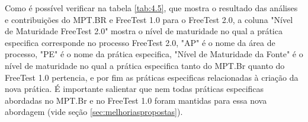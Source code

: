 Como é possível verificar na tabela \ref{tab:4.5}, que mostra o resultado das análises e contribuições do MPT.BR e FreeTest 1.0 para o FreeTest 2.0, a coluna "Nível de Maturidade FreeTest 2.0" mostra o nível de maturidade no qual a prática especifica corresponde no processo FreeTest 2.0, "AP" é o nome da área de processo, "PE" é o nome da prática especifica, "Nível de Maturidade da Fonte" é o nível de maturidade no qual a prática especifica tanto do MPT.Br quanto do FreeTest 1.0 pertencia, e por fim as práticas especificas relacionadas à criação da nova prática. É importante salientar que nem todas práticas especificas abordadas no MPT.Br e no FreeTest 1.0 foram mantidas para essa nova abordagem (vide seção \ref{sec:melhoriaspropostas}).


\begin{table}[H]
\centering
\caption{Proposta para o FreeTest 2.0: Readaptação com a junção de práticas especificas e alteração de nível de maturidade.}
\label{tab:4.5}
\end{table}
